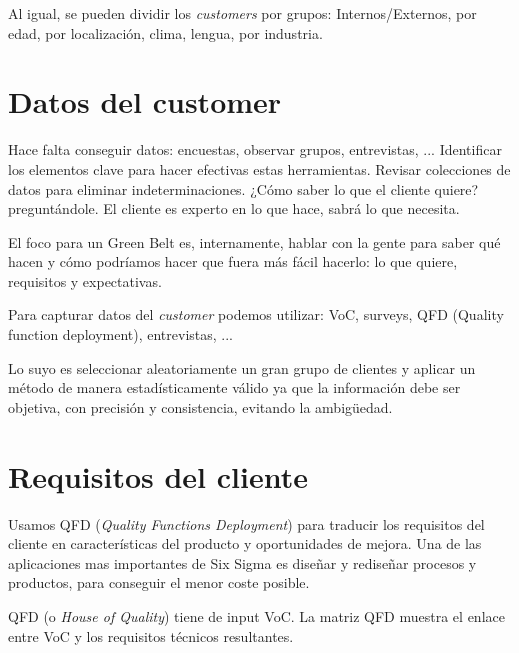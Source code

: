 \documentclass[oneside]{book}
\begin{document}
Al igual, se pueden dividir los \textit{customers} por grupos: Internos/Externos, por edad, por localización, clima, lengua, por industria.

\section{Datos del customer}

Hace falta conseguir datos: encuestas, observar grupos, entrevistas, ... Identificar los elementos clave para hacer efectivas estas herramientas. Revisar colecciones de datos para eliminar indeterminaciones.
¿Cómo saber lo que el cliente quiere? preguntándole. El cliente es experto en lo que hace, sabrá lo que necesita. 

El foco para un Green Belt es, internamente, hablar con la gente para saber qué hacen y cómo podríamos hacer que fuera más fácil hacerlo: lo que quiere, requisitos y expectativas. 

Para capturar datos del \textit{customer} podemos utilizar: VoC, surveys, QFD (Quality function deployment), entrevistas, ...

Lo suyo es seleccionar aleatoriamente un gran grupo de clientes y aplicar un método de manera estadísticamente válido ya que la información debe ser objetiva, con precisión y consistencia, evitando la ambigüedad. 

\section{Requisitos del cliente}

Usamos QFD (\textit{Quality Functions Deployment}) para traducir los requisitos del cliente en características del producto y oportunidades de mejora. Una de las aplicaciones mas importantes de Six Sigma es diseñar y rediseñar procesos y productos, para conseguir el menor coste posible.

QFD (o \textit{House of Quality}) tiene de input VoC. La matriz QFD muestra el enlace entre VoC y los requisitos técnicos resultantes.
\end{document}
